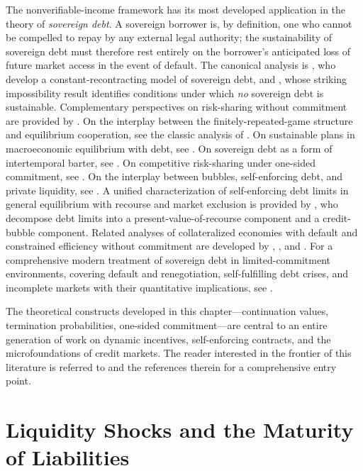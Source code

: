 \documentclass[11pt,a4paper,oneside]{book}
\theoremstyle{plain}
\theoremstyle{definition}
\theoremstyle{remark}
\numberwithin{equation}{chapter}
\begin{document}
The nonverifiable-income framework has its most developed application in the theory of \emph{sovereign debt}.
A sovereign borrower is, by definition, one who cannot be compelled to repay by any external legal authority; the sustainability of sovereign debt must therefore rest entirely on the borrower's anticipated loss of future market access in the event of default.
The canonical analysis is \citet{BulowRogoff1989a}, who develop a constant-recontracting model of sovereign debt, and \citet{BulowRogoff1989b}, whose striking impossibility result identifies conditions under which \emph{no} sovereign debt is sustainable.
Complementary perspectives on risk-sharing without commitment are provided by \citet{Kocherlakota1996}.
On the interplay between the finitely-repeated-game structure and equilibrium cooperation, see the classic analysis of \citet{KrepsMilgromRobertsWilson1982}.
On sustainable plans in macroeconomic equilibrium with debt, see \citet{ChariKehoe1993}.
On sovereign debt as a form of intertemporal barter, see \citet{KletzerWright2000}.
On competitive risk-sharing under one-sided commitment, see \citet{KruegerUhlig2006}.
On the interplay between bubbles, self-enforcing debt, and private liquidity, see \citet{HellwigLorenzoni2009}.
A unified characterization of self-enforcing debt limits in general equilibrium with recourse and market exclusion is provided by \citet{MartinsPhanVailakis2019}, who decompose debt limits into a present-value-of-recourse component and a credit-bubble component.
Related analyses of collateralized economies with default and constrained efficiency without commitment are developed by \citet{MartinsVailakis2012a}, \citet{MartinsVailakis2012b}, and \citet{MartinsVailakis2015}.
For a comprehensive modern treatment of sovereign debt in limited-commitment environments, covering default and renegotiation, self-fulfilling debt crises, and incomplete markets with their quantitative implications, see \citet{AguiarAmador2014}.

The theoretical constructs developed in this chapter---continuation values, termination probabilities, one-sided commitment---are central to an entire generation of work on dynamic incentives, self-enforcing contracts, and the microfoundations of credit markets.
The reader interested in the frontier of this literature is referred to \citet{Tirole2006} and the references therein for a comprehensive entry point.

\chapter{Liquidity Shocks and the Maturity of Liabilities}
\label{ch:maturity}
\end{document}

